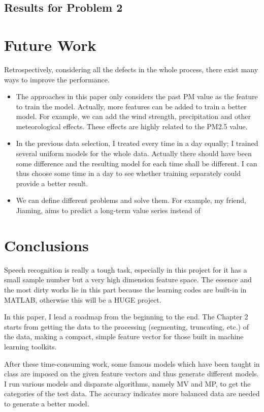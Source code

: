 \documentclass{sig-alternate}
\begin{document}
\subsection{Results for Problem 2}


\section{Future Work}


Retrospectively, considering all the defects in the whole process, there exist many ways to improve the performance.

\begin{itemize}
    \item The approaches in this paper only considers the past PM value as the feature to train the model. Actually, more features can be added to train a better model. For example, we can add the wind strength, precipitation and other meteorological effects. These effects are highly related to the PM2.5 value.
    \item In the previous data selection, I treated every time in a day equally; I trained several uniform models for the whole data. Actually there should have been some difference and the resulting model for each time shall be different. I can thus choose some time in a day to see whether training separately could provide a better result.
    \item We can define different problems and solve them. For example, my friend, Jiaming, aims to predict a long-term value series instead of
\end{itemize}

\section{Conclusions}
Speech recognition is really a tough task, especially in this project for it has a small sample number but a very high dimension feature space. The essence and the most dirty works lie in this part because the learning codes are built-in in MATLAB, otherwise this will be a HUGE project.

In this paper, I lead a roadmap from the beginning to the end. The Chapter 2 starts from getting the data to the processing (segmenting, truncating, etc.) of the data, making a compact, simple feature vector for those built in machine learning toolkits.

After these time-consuming work, some famous models which have been taught in class are imposed on the given feature vectors and thus generate different models. I run various models and disparate algorithms, namely MV and MP, to get the categories of the test data. The accuracy indicates more balanced data are needed to generate a better model.
\end{document}
